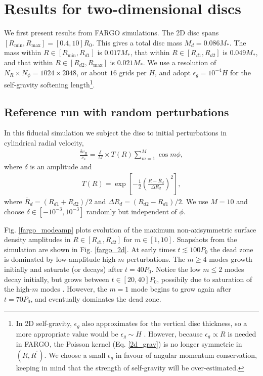 \section{Results for two-dimensional discs}
We first present results from FARGO simulations. The 2D disc spans
$[R_\mathrm{min}, R_\mathrm{max}] = [0.4,10]R_0$. This gives a total
disc mass $M_{d}=0.086M_*$. The mass within
$R\in[R_\mathrm{min},R_{d1}]$ is $0.017M_*$, that within
$R\in[R_{d1},R_{d2}]$ is $0.049M_*$, and that within
$R\in[R_{d2},R_\mathrm{max}]$ is $0.021M_*$. We use a resolution of
$N_R\times N_\phi = 1024\times 2048$, or about $16$ grids per $H$, and
adopt $\epsilon_g=10^{-4}H$ for the   
self-gravity softening length\footnote{In 2D self-gravity, $\epsilon_g$ also
  approximates for the vertical disc thickness, so a more appropriate
  value would be $\epsilon_g\sim H$ \citep{muller12}. However, because
  $\epsilon_g\propto R$ is needed in FARGO, the Poisson kernel
  (Eq. \ref{2d_grav}) is no longer symmetric in $(R,R^\prime)$. We
  choose a small  
  $\epsilon_g$ in favour of angular momentum conservation, keeping in
  mind that the strength of self-gravity will be over-estimated.}.


\subsection{Reference run with random perturbations}
In this fiducial simulation we subject the disc to initial perturbations in
cylindrical radial velocity, 
\begin{align}\label{randpert}
  \frac{\delta v_R}{c_s} = \frac{\delta}{M}\times T(R) \sum_{m=1}^M\cos{m\phi},
\end{align}
where $\delta$ is an amplitude and 
\begin{align}
  T(R) =
  \exp{\left[-\frac{1}{2}\left(\frac{R-\overline{R}_d}{\Delta
          R_d}\right)^2\right]}, 
\end{align}
where $\overline{R}_d = (R_{d1}+R_{d2})/2$ and $\Delta R_d =
(R_{d2}-R_{d1})/2$. We use $M=10$ and choose
$\delta\in[-10^{-3},10^{-3}]$ randomly but independent of $\phi$. 

Fig. \ref{fargo_modeamp} plots evolution of the maximum
non-axisymmetric surface density amplitudes in $R\in[R_{d1},R_{d2}]$
for $m\in[1,10]$. Snapshots from the simulation are shown in
Fig. \ref{fargo_2d}. 
At early times $t\lesssim100P_0$ the dead zone is
dominated by low-amplitude high-$m$ perturbations. The $m\geq4$ modes
growth initially and saturate (or decays) after $t=40P_0$. Notice the
low $m\leq 2$ modes decay initially, but grows between $t\in[20,40]P_0$,
possibily due to saturation of the high-$m$ modes  
\citep{laughlin96,laughlin97}. However, the $m=1$ mode begins to grow
again after $t=70P_0$, and eventually dominates the dead zone. 

